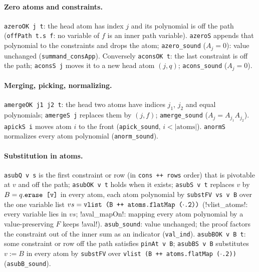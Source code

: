 \paragraph{Zero atoms and constraints.} \textnormal{\texttt{azeroOK j t}}: the head atom has index $j$ and its
polynomial is off the path (\textnormal{\texttt{offPath t.\allowbreak{}s f}}: no variable of $f$ is an inner path variable).
\textnormal{\texttt{azeroS}} appends that polynomial to the constraints and drops the atom; \textnormal{\texttt{azero\_\allowbreak{}sound}}
($A_j=0$): value unchanged (\textnormal{\texttt{summand\_\allowbreak{}consApp}}). Conversely \textnormal{\texttt{aconsOK t}}: the last
constraint is off the path; \textnormal{\texttt{aconsS j}} moves it to a new head atom $(j,q)$;
\textnormal{\texttt{acons\_\allowbreak{}sound}} ($A_j=0$).

\paragraph{Merging, picking, normalizing.} \textnormal{\texttt{amergeOK j1 j2 t}}: the head two atoms have indices
$j_1$, $j_2$ and equal polynomials; \textnormal{\texttt{amergeS j}} replaces them by $(j,f)$;
\textnormal{\texttt{amerge\_\allowbreak{}sound}} ($A_j = A_{j_1}A_{j_2}$). \textnormal{\texttt{apickS i}} moves atom $i$ to the front
(\textnormal{\texttt{apick\_\allowbreak{}sound}}, $i<|\text{atoms}|$). \textnormal{\texttt{anormS}} normalizes every atom polynomial
(\textnormal{\texttt{anorm\_\allowbreak{}sound}}).

\paragraph{Substitution in atoms.} \textnormal{\texttt{asubQ v s}} is the first constraint or row (in
\textnormal{\texttt{cons ++ rows}} order) that is pivotable at $v$ and off the path; \textnormal{\texttt{asubOK v t}} holds when it
exists; \textnormal{\texttt{asubS v t}} replaces $v$ by $B=q.\textnormal{\texttt{erase [v]}}$ in every atom, each atom polynomial
by \textnormal{\texttt{substFV vs v B}} over the one variable list $vs=\textnormal{\texttt{vlist (B ++ atoms.flatMap (\ensuremath{\cdot}.2))}}$
(\lean!vlist_atoms!: every variable lies in $vs$; \lean!aval_mapOn!: mapping every atom polynomial by
a value-preserving $F$ keeps \lean!aval!).
\textnormal{\texttt{asub\_\allowbreak{}sound}}: value unchanged; the proof factors the constraint out of the inner sum as an
indicator (\textnormal{\texttt{val\_\allowbreak{}ind}}). \textnormal{\texttt{asubBOK v B t}}: some constraint or row off the path satisfies
\textnormal{\texttt{pinAt v B}}; \textnormal{\texttt{asubBS v B}} substitutes $v:=B$ in every atom by \textnormal{\texttt{substFV}} over
\textnormal{\texttt{vlist (B ++ atoms.flatMap (\ensuremath{\cdot}.2))}} (\textnormal{\texttt{asubB\_\allowbreak{}sound}}).


